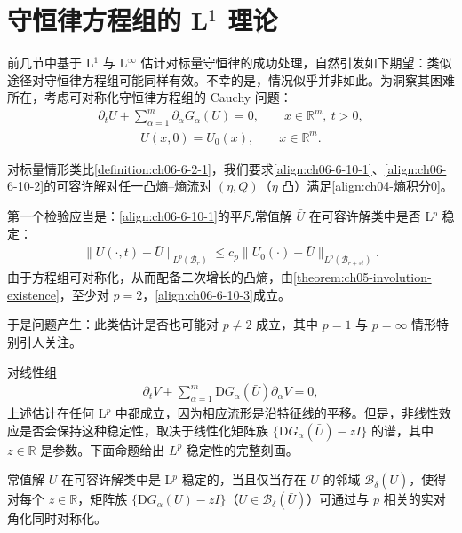 \documentclass[../../main.tex]{subfiles}
\begin{document}
\section{守恒律方程组的 L$^{1}$ 理论}\label{section:ch06-方程组L1理论}

前几节中基于 L$^{1}$ 与 L$^{\infty}$ 估计对标量守恒律的成功处理，自然引发如下期望：类似途径对守恒律方程组可能同样有效。不幸的是，情况似乎并非如此。为洞察其困难所在，考虑可对称化守恒律方程组的 Cauchy 问题：
\begin{align}
\partial_{t}U+\sum_{\alpha=1}^{m}\partial_{\alpha}G_{\alpha}(U)=0,\qquad x\in\mathbb{R}^{m},\ t>0,
\label{align:ch06-6-10-1}
\end{align}
\begin{align}
U(x,0)=U_{0}(x),\qquad x\in\mathbb{R}^{m}.
\label{align:ch06-6-10-2}
\end{align}

对标量情形类比\cref{definition:ch06-6-2-1}，我们要求\eqref{align:ch06-6-10-1}、\eqref{align:ch06-6-10-2}的可容许解对任一凸熵--熵流对 $(\eta,Q)$（$\eta$ 凸）满足\eqref{align:ch04-熵积分0}。

第一个检验应当是：\eqref{align:ch06-6-10-1}的平凡常值解 $\bar{U}$ 在可容许解类中是否 L$^{p}$ 稳定：
\begin{align}
\|U(\cdot,t)-\bar{U}\|_{L^{p}(\mathscr{B}_{r})}\leqslant c_{p}\|U_{0}(\cdot)-\bar{U}\|_{L^{p}(\mathscr{B}_{r+st})}.
\label{align:ch06-6-10-3}
\end{align}
由于方程组可对称化，从而配备二次增长的凸熵，由\cref{theorem:ch05-involution-existence}，至少对 $p=2$，\eqref{align:ch06-6-10-3}成立。

于是问题产生：此类估计是否也可能对 $p\neq 2$ 成立，其中 $p=1$ 与 $p=\infty$ 情形特别引人关注。

对线性组
\begin{align}
\partial_{t}V+\sum_{\alpha=1}^{m}\mathrm{D}G_{\alpha}(\bar{U})\partial_{\alpha}V=0,
\label{align:ch06-6-10-4}
\end{align}
上述估计在任何 L$^{p}$ 中都成立，因为相应流形是沿特征线的平移。但是，非线性效应是否会保持这种稳定性，取决于线性化矩阵族 $\{\mathrm{D}G_{\alpha}(\bar{U})-zI\}$ 的谱，其中 $z\in\mathbb{R}$ 是参数。下面命题给出 $L^{p}$ 稳定性的完整刻画。

\begin{theorem}\label{theorem:ch06-6-10-1}
常值解 $\bar{U}$ 在可容许解类中是 L$^{p}$ 稳定的，当且仅当存在 $\bar{U}$ 的邻域 $\mathscr{B}_{\delta}(\bar{U})$，使得对每个 $z\in\mathbb{R}$，矩阵族 $\{\mathrm{D}G_{\alpha}(U)-zI\}$（$U\in\mathscr{B}_{\delta}(\bar{U})$）可通过与 $p$ 相关的实对角化同时对称化。
\end{theorem}
\end{document}
